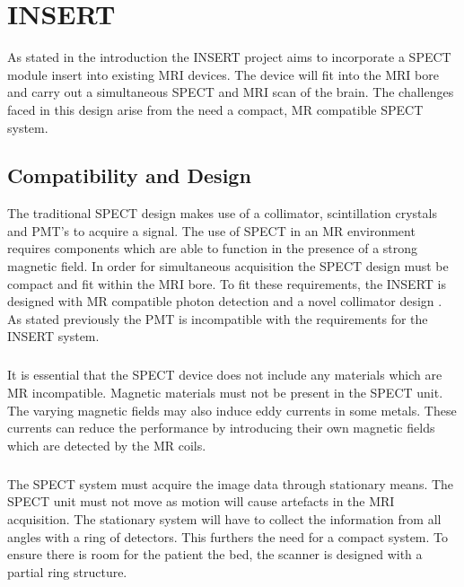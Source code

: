 \chapter{INSERT}
\label{chapterlabel2}

As stated in the introduction the INSERT project aims to incorporate a SPECT module insert into existing MRI devices. The device will fit into the MRI bore and carry out a simultaneous SPECT and MRI scan of the brain. The challenges faced in this design arise from the need a compact, MR compatible SPECT system.
\section{Compatibility and Design}
The traditional SPECT design makes use of a collimator, scintillation crystals and PMT's to acquire a signal. The use of SPECT in an MR environment requires components which are able to function in the presence of a strong magnetic field. In order for simultaneous acquisition the SPECT design must be compact and fit within the MRI bore. To fit these requirements, the INSERT is designed with MR compatible photon detection \cite{7287793} and a novel collimator design \cite{7181734}. As stated previously the PMT is incompatible with the requirements for the INSERT system. 
\paragraph{}
It is essential that the SPECT device does not include any materials which are MR incompatible. Magnetic materials must not be present in the SPECT unit. The varying magnetic fields may also induce eddy currents in some metals. These currents can reduce the performance by introducing their own magnetic fields which are detected by the MR coils. 
\paragraph{}
The SPECT system must acquire the image data through stationary means. The SPECT unit must not move as motion will cause artefacts in the MRI acquisition. The stationary system will have to collect the information from all angles with a ring of detectors. This furthers the need for a compact system. To ensure there is room for the patient the bed, the scanner is designed with a partial ring structure.
